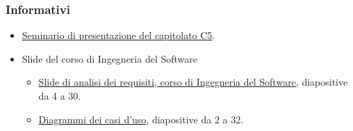 \documentclass[../analisi-dei-requisiti.tex]{subfiles}
\begin{document}
\subsubsection{Informativi}%
\label{par:informativi}
\begin{itemize}
  \item \href{https://www.math.unipd.it/~tullio/IS-1/2019/Dispense/C5a.pdf}{Seminario di presentazione del capitolato C5}.
  \item Slide del corso di Ingegneria del Software
        \begin{itemize}
          \item \href{https://www.math.unipd.it/~tullio/IS-1/2019/Dispense/L08.pdf}{Slide di analisi dei requisiti, corso di Ingegneria del Software}, diapositive da 4 a 30.
          \item \href{https://www.math.unipd.it/~tullio/IS-1/2019/Dispense/E03.pdf}{Diagrammi dei casi d'uso}, diapositive da 2 a 32.
        \end{itemize}
\end{itemize}
\end{document}

